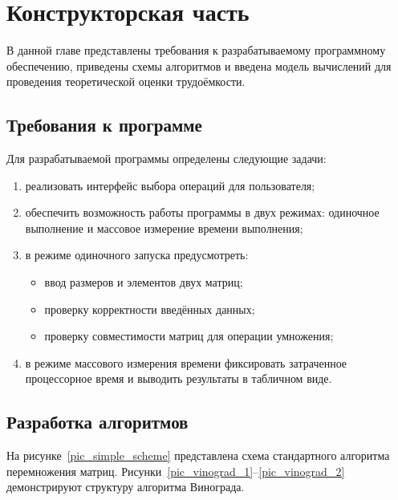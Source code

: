 \chapter{Конструкторская часть}

В данной главе представлены требования к разрабатываемому программному обеспечению, приведены схемы алгоритмов и введена модель вычислений для проведения теоретической оценки трудоёмкости.

\section{Требования к программе}

Для разрабатываемой программы определены следующие задачи:
\begin{enumerate}
	\item реализовать интерфейс выбора операций для пользователя;
	\item обеспечить возможность работы программы в двух режимах: одиночное выполнение и массовое измерение времени выполнения;
	\item в режиме одиночного запуска предусмотреть:
	\begin{itemize}
		\item ввод размеров и элементов двух матриц;
		\item проверку корректности введённых данных;
		\item проверку совместимости матриц для операции умножения;
	\end{itemize}
	\item в режиме массового измерения времени фиксировать затраченное процессорное время и выводить результаты в табличном виде.
\end{enumerate}

\section{Разработка алгоритмов}

На рисунке~\ref{pic_simple_scheme} представлена схема стандартного алгоритма перемножения матриц. Рисунки~\ref{pic_vinograd_1}--\ref{pic_vinograd_2} демонстрируют структуру алгоритма Винограда.

